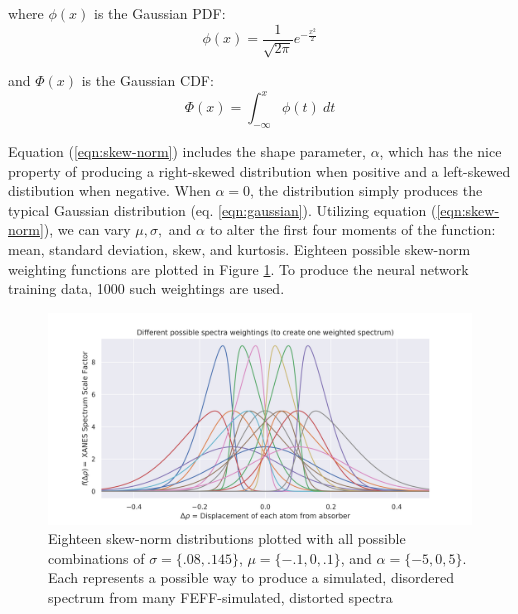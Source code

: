 \noindent
where $ \phi(x) $ is the Gaussian PDF:
\begin{equation}
	\label{eqn:skew-norm-pdf}
	\phi (x)={\frac  {1}{{\sqrt  {2\pi }}}}e^{{-{\frac  {x^{2}}{2}}}}
\end{equation}

\noindent
and $ \Phi (x) $ is the Gaussian CDF:
\begin{equation}
	\label{eqn:skew-norm-cdf}
	\Phi (x)=\int _{{-\infty }}^{{x}}\phi (t)\ dt
\end{equation}



\noindent
Equation (\ref{eqn:skew-norm}) includes the shape parameter, $ \alpha $, which has the nice property of producing a right-skewed distribution when positive and a left-skewed distibution when negative. When $ \alpha=0 $, the distribution simply produces the typical Gaussian distribution (eq. \ref{eqn:gaussian}). Utilizing equation (\ref{eqn:skew-norm}), we can vary $ \mu, \sigma,  $ and $ \alpha $ to alter the first four moments of the function: mean, standard deviation, skew, and kurtosis. Eighteen possible skew-norm weighting functions are plotted in Figure \ref{fig:skew-norm-options}. To produce the neural network training data, 1000 such weightings are used.

\begin{figure}[h!]
	\centering
	\includegraphics[width=\linewidth]{Chapters/Figures/skewnorm_options.png}
	\caption[Simulated Disordered Spectrum Weightings]{Eighteen skew-norm distributions plotted with all possible combinations of $ \sigma=\{.08, .145\} $, $ \mu=\{-.1, 0, .1\} $, and $ \alpha=\{-5,0,5\} $. Each represents a possible way to produce a simulated, disordered spectrum from many FEFF-simulated, distorted spectra} 
	\label{fig:skew-norm-options}
\end{figure}

